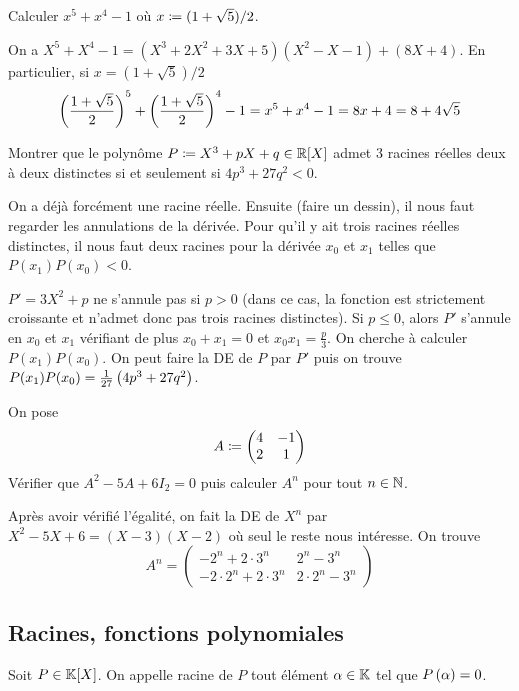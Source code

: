 \documentclass{magnolia}
\begin{document}
  \begin{exos}
  \exo Calculer $x^5+x^4-1$ où $x\coloneqq(1+\sqrt{5})/2$.
    \begin{sol}
    On a $X^5+X^4-1=(X^3+2X^2+3X+5)(X^2-X-1)+(8X+4)$. En particulier,
    si $x=(1+\sqrt{5})/2$
    \[\left(\frac{1+\sqrt{5}}{2}\right)^5+\left(\frac{1+\sqrt{5}}{2}\right)^4-1=x^5+x^4-1=8x+4=
      8+4\sqrt{5}\]  
    \end{sol}
  \exo Montrer que le polynôme $P\defeq X^3+pX+q\in\polyR$ admet 3 racines réelles
    deux à deux distinctes si et seulement si $4p^3+27q^2<0$.
    \begin{sol}
    On a déjà forcément une racine réelle. Ensuite (faire un dessin), il nous faut regarder les annulations de la dérivée. Pour qu'il y ait trois racines réelles distinctes, il nous faut deux racines pour la dérivée $x_0$ et $x_1$ telles que $P(x_1)P(x_0)<0$.
    
    $P'=3X^2+p$ ne s'annule pas si $p>0$ (dans ce cas, la fonction est strictement croissante et n'admet donc pas trois racines distinctes). Si $p\leq 0$, alors $P'$ s'annule en $x_0$ et $x_1$ vérifiant de plus $x_0+x_1=0$ et $x_0x_1=\frac{p}{3}$. On cherche à calculer $P(x_1)P(x_0)$. On peut faire la DE de $P$ par $P'$ puis on trouve $P(x_1)P(x_0)=\frac{1}{27}\left(4p^3+27q^2\right)$.
    \end{sol}
      \exo On pose
      \[A\coloneqq
      \begin{pmatrix}
      4 & -1\\
      2 & 1
      \end{pmatrix}\]
      Vérifier que $A^2-5A+6I_2=0$ puis calculer $A^n$ pour tout $n\in\mathbb{N}$.
      \begin{sol}
      Après avoir vérifié l'égalité, on fait la DE de $X^n$ par $X^2-5X+6=(X-3)(X-2)$ où seul le reste nous intéresse.
      On trouve
      \[A^n=
      \begin{pmatrix}
      -2^n+2\cdot 3^n & 2^n-3^n\\
      -2\cdot 2^n+2\cdot 3^n & 2\cdot 2^n-3^n
      \end{pmatrix}\]
      \end{sol}
  \end{exos}

\subsection{Racines, fonctions polynomiales}

\begin{definition}
Soit $P\in\polyK$. On appelle racine de $P$ tout élément $\alpha\in\mathbb{K}$ tel que
$P\left(\alpha\right)=0$.
\end{definition}
\end{document}
